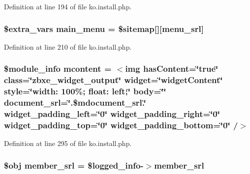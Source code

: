 Definition at line 194 of file ko.\+install.\+php.

\hypertarget{ko_8install_8php_ac71104c770b8ced3891f35849d3f2906}{}
\subsubsection[{main\+\_\+menu}]{\setlength{\rightskip}{0pt plus 5cm}\${\bf extra\+\_\+vars} main\+\_\+menu = \$sitemap\mbox{[}\textquotesingle{}\mbox{]}\mbox{[}\textquotesingle{}menu\+\_\+srl\textquotesingle{}\mbox{]}}\label{ko_8install_8php_ac71104c770b8ced3891f35849d3f2906}


Definition at line 210 of file ko.\+install.\+php.

\hypertarget{ko_8install_8php_a9da4bb6e77356bb68ae0e05dbd9f5e2f}{}
\subsubsection[{mcontent}]{\setlength{\rightskip}{0pt plus 5cm}\$module\+\_\+info {\bf mcontent} = \textquotesingle{}$<$img has\+Content=\char`\"{}true\char`\"{} class=\char`\"{}zbxe\+\_\+widget\+\_\+output\char`\"{} widget=\char`\"{}widget\+Content\char`\"{} style=\char`\"{}width\+: 100\%; float\+: left;\char`\"{} body=\char`\"{}\char`\"{} document\+\_\+srl=\char`\"{}\textquotesingle{}.\$mdocument\+\_\+srl.\textquotesingle{}\char`\"{} widget\+\_\+padding\+\_\+left=\char`\"{}0\char`\"{} widget\+\_\+padding\+\_\+right=\char`\"{}0\char`\"{} widget\+\_\+padding\+\_\+top=\char`\"{}0\char`\"{} widget\+\_\+padding\+\_\+bottom=\char`\"{}0\char`\"{} /$>$\textquotesingle{}}\label{ko_8install_8php_a9da4bb6e77356bb68ae0e05dbd9f5e2f}


Definition at line 295 of file ko.\+install.\+php.

\hypertarget{ko_8install_8php_aa61f9e08f0fe505094d26f8143f30bbd}{}
\subsubsection[{member\+\_\+srl}]{\setlength{\rightskip}{0pt plus 5cm}\$obj member\+\_\+srl = \$logged\+\_\+info-\/$>$member\+\_\+srl}\label{ko_8install_8php_aa61f9e08f0fe505094d26f8143f30bbd}


